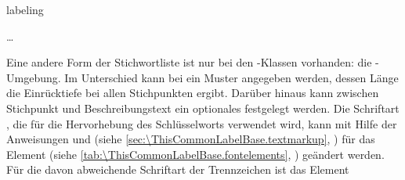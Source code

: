 \begin{Declaration}
  \begin{Environment}{labeling}
    \begin{Body}
       \dots
      \BodyDots
    \end{Body}
  \end{Environment}
\end{Declaration}%
Eine andere Form der %
%
Stichwortliste ist nur bei den
{\KOMAScript}-Klassen %
%
vorhanden: die -Umgebung. Im Unterschied
 kann bei  ein Muster angegeben werden, dessen Länge
die Einrücktiefe bei allen Stichpunkten ergibt. Darüber hinaus kann zwischen
Stichpunkt und Beschreibungstext ein optionales 
festgelegt werden. %
\BeginIndexGroup
{}%
%
%
Die Schriftart%
%
, die für die Hervorhebung des Schlüsselworts verwendet wird, kann mit Hilfe
der Anweisungen  und
 (siehe
\autoref{sec:\ThisCommonLabelBase.textmarkup},
) für das Element
 (siehe
\autoref{tab:\ThisCommonLabelBase.fontelements},
) geändert werden. Für die
davon abweichende Schriftart der Trennzeichen ist das Element

